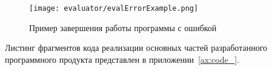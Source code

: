 \begin{figure}[!htb]
	\centering
	\texttt{[image: evaluator/evalErrorExample.png]}
	\caption{Пример завершения работы программы с ошибкой}
	\label{f:evalErrorExample}
\end{figure}

Листинг фрагментов кода реализации основных частей разработанного программного продукта представлен в приложении~\ref{ax:code_}.